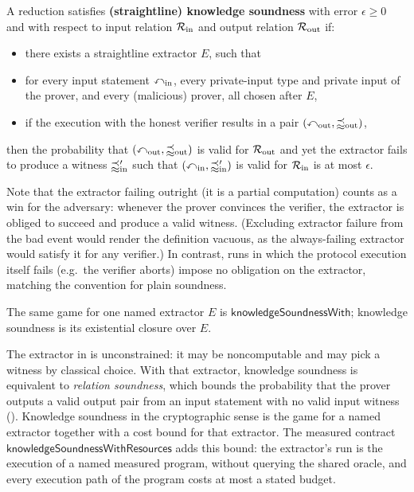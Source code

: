 \begin{definition}
    \label{def:knowledge_soundness}
    A reduction satisfies \textbf{(straightline) knowledge soundness} with error \(\epsilon \geq 0\) and
    with respect to input relation \(\mathcal{R}_{\mathrm{in}}\) and output relation \(\mathcal{R}_{\mathrm{out}}\) if:
    \begin{itemize}
        \item there exists a straightline extractor \(E\), such that
        \item for every input statement \(\mathbb{x}_{\text{in}}\), every private-input type and private input
        of the prover, and every (malicious) prover, all chosen after \(E\),
        \item if the execution with the honest verifier results in a pair \((\mathbb{x}_{\text{out}}, \mathbb{w}_{\text{out}})\),
    \end{itemize}
    then the probability that \((\mathbb{x}_{\text{out}}, \mathbb{w}_{\text{out}})\) is valid for \(\mathcal{R}_{\mathrm{out}}\) and yet the extractor fails to produce a witness \(\mathbb{w}'_{\text{in}}\) such that \((\mathbb{x}_{\text{in}}, \mathbb{w}'_{\text{in}})\) is valid for \(\mathcal{R}_{\mathrm{in}}\) is at most \(\epsilon\).

    Note that the extractor failing outright (it is a partial computation) counts as a win for the adversary: whenever the prover convinces the verifier, the extractor is obliged to succeed and produce a valid witness. (Excluding extractor failure from the bad event would render the definition vacuous, as the always-failing extractor would satisfy it for any verifier.) In contrast, runs in which the protocol execution itself fails (e.g.\ the verifier aborts) impose no obligation on the extractor, matching the convention for plain soundness.

    The same game for one named extractor \(E\) is \(\mathsf{knowledgeSoundnessWith}\); knowledge
    soundness is its existential closure over \(E\).
    \leanok
\end{definition}

\begin{remark}
    \label{rem:extraction_cost}
    The extractor in  is unconstrained: it may be noncomputable and
    may pick a witness by classical choice. With that extractor, knowledge soundness is equivalent
    to \emph{relation soundness}, which bounds the probability that the prover outputs a valid
    output pair from an input statement with no valid input witness
    (). Knowledge soundness in the
    cryptographic sense is the game for a named extractor together with a cost bound for that
    extractor. The measured contract
    \(\mathsf{knowledgeSoundnessWithResources}\) adds this bound: the extractor's run is the
    execution of a named measured program, without querying the shared oracle, and every
    execution path of the program costs at most a stated budget.
\end{remark}

